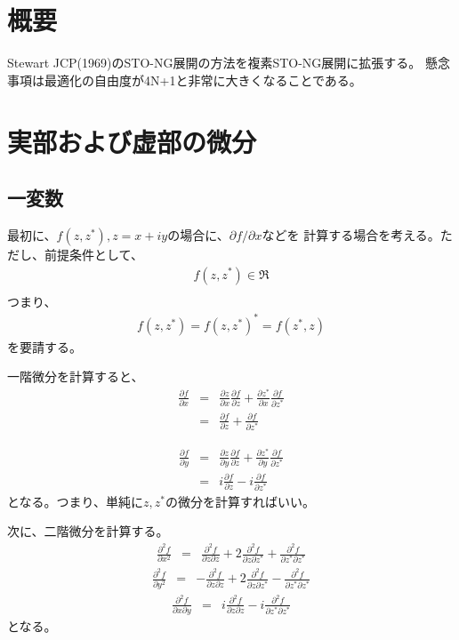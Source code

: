 \documentclass[a4paper]{jsarticle}
\begin{document}
\title{}
\author{松崎　黎}
\maketitle



\section{概要}
Stewart JCP(1969)のSTO-NG展開の方法を複素STO-NG展開に拡張する。
 懸念事項は最適化の自由度が4N+1と非常に大きくなることである。

\section{実部および虚部の微分}
\subsection{一変数}
最初に、$f(z,z^*), z=x+iy$の場合に、$\partial f/\partial x$などを
計算する場合を考える。ただし、前提条件として、
\begin{eqnarray}
  f(z, z^*) \in \Re \\
\end{eqnarray}
つまり、
\begin{eqnarray}
  f(z, z^*) = f(z, z^*)^* = f(z^*, z)
\end{eqnarray}
を要請する。

一階微分を計算すると、
\begin{eqnarray}
  \frac{\partial f}{\partial x} &=&
  \frac{\partial z}{\partial x} \frac{\partial f}{\partial z} + \frac{\partial z^*}{\partial x} \frac{\partial f}{\partial z^*} 
  \\ &=&
  \frac{\partial f}{\partial z} + \frac{\partial f}{\partial z^*}
\end{eqnarray}

\begin{eqnarray}
  \frac{\partial f}{\partial y} &=&
  \frac{\partial z}{\partial y} \frac{\partial f}{\partial z} + \frac{\partial z^*}{\partial y} \frac{\partial f}{\partial z^*} 
  \\ &=&
  i \frac{\partial f}{\partial z} -i \frac{\partial f}{\partial z^*}
\end{eqnarray}
となる。つまり、単純に$z,z^*$の微分を計算すればいい。

次に、二階微分を計算する。
\begin{eqnarray}
  \frac{\partial^2 f}{\partial x^2} &=&
  \frac{\partial^2 f}{\partial z\partial z} +
  2\frac{\partial^2 f}{\partial z\partial z^*} +
  \frac{\partial^2 f}{\partial z^* \partial z^*} 
\end{eqnarray}
\begin{eqnarray}
  \frac{\partial^2 f}{\partial y^2} &=&
  -\frac{\partial^2 f}{\partial z\partial z} 
  +2\frac{\partial^2 f}{\partial z\partial z^*} 
  -\frac{\partial^2 f}{\partial z^* \partial z^*}   
\end{eqnarray}
\begin{eqnarray}
  \frac{\partial^2 f}{\partial x\partial y} &=&
  i\frac{\partial^2 f}{\partial z\partial z} 
  -i\frac{\partial^2 f}{\partial z^* \partial z^*}   
\end{eqnarray}
となる。
\end{document}
